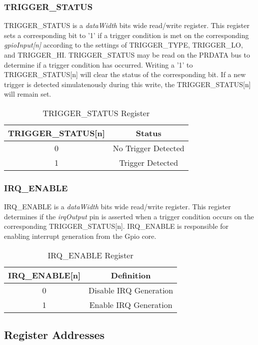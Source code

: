 \subsubsection{TRIGGER\_STATUS}
TRIGGER\_STATUS is a \textit{dataWidth} bits wide read/write register. This register sets a corresponding bit to '1' if a trigger condition is met on
the corresponding \textit{gpioInput[n]} according to the settings of TRIGGER\_TYPE, TRIGGER\_LO, and TRIGGER\_HI.
\newline
\newline
TRIGGER\_STATUS may be read on the PRDATA bus to determine if a trigger condition has occurred. Writing a '1' to TRIGGER\_STATUS[n] will clear the 
status of the corresponding bit. If a new trigger is detected simulatenously during this write, the TRIGGER\_STATUS[n] will remain set.
\begin{table}[h]
  \centering
  \begin{tabular}{|c|c|}
      \hline
      \textbf{TRIGGER\_STATUS[n]} & \textbf{Status} \\ \hline
      0 & No Trigger Detected \\ \hline
      1 & Trigger Detected\\ \hline
  \end{tabular}
  \caption{TRIGGER\_STATUS Register}
\end{table}

\newpage
\subsubsection{IRQ\_ENABLE}
IRQ\_ENABLE is a \textit{dataWidth} bits wide read/write register. This register determines if the \textit{irqOutput} pin is asserted when a trigger condition
occurs on the corresponding TRIGGER\_STATUS[n]. IRQ\_ENABLE is responsible for enabling interrupt generation from the Gpio core.
\begin{table}[h]
  \centering
  \begin{tabular}{|c|c|}
      \hline
      \textbf{IRQ\_ENABLE[n]} & \textbf{Definition} \\ \hline
      0 & Disable IRQ Generation\\ \hline
      1 & Enable IRQ Generation \\ \hline
  \end{tabular}
  \caption{IRQ\_ENABLE Register}
\end{table}

\newpage

\subsection{Register Addresses}
